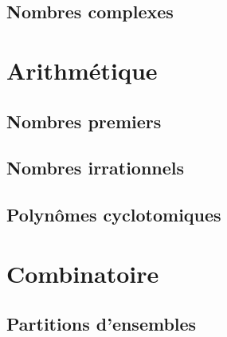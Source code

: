 \documentclass[a4paper,11pt]{book}
\begin{document}

\clearpage

\chapter{Nombres complexes}


\clearpage


\clearpage

\part{Arithmétique}

\chapter{Nombres premiers}


\clearpage

\chapter{Nombres irrationnels}


\clearpage

\chapter{Polynômes cyclotomiques}


\clearpage

\part{Combinatoire}

\chapter{Partitions d'ensembles}


\clearpage

\end{document}
